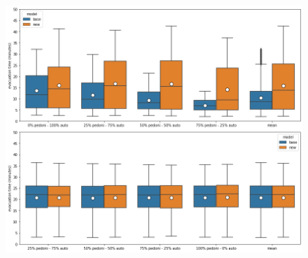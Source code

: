 \begin{figure}
    \centering
    \includegraphics[width=\textwidth]{images/analisi/comparison-evtimes2.png}
    \caption{}
    \label{fig:analisi-comparison-evtimes2}
\end{figure}


